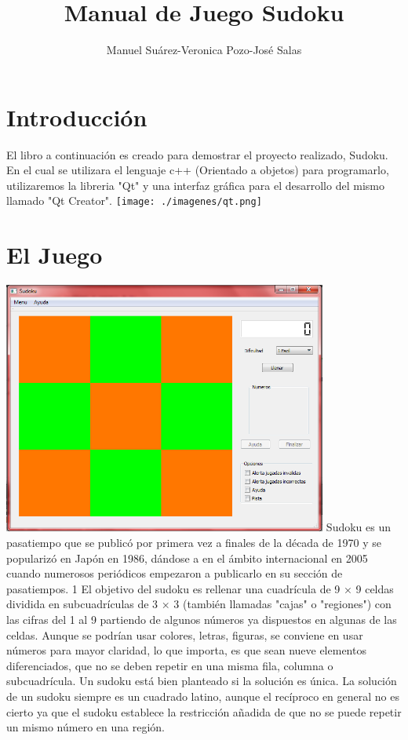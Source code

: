 \documentclass[12pt,oneside]{book}
\title{Manual de Juego Sudoku}
\author{Manuel Suárez-Veronica Pozo-José Salas}
\begin{document}
\maketitle
\tableofcontents

\chapter{Introducción}

El libro a continuación es creado para demostrar el proyecto realizado, Sudoku. 
En el cual se utilizara el lenguaje c++ (Orientado a objetos) para programarlo, utilizaremos la libreria "Qt" y una interfaz gráfica para el desarrollo del mismo llamado
"Qt Creator". 
	\texttt{[image: ./imagenes/qt.png]}

\chapter{El Juego}
	\includegraphics[width=0.8\textwidth]{./imagenes/PantallaPrincipal.png}
	Sudoku es un pasatiempo que se publicó por primera vez a finales de la década de 1970 y se popularizó en Japón en 1986, dándose a 
	en el ámbito internacional en 2005 cuando numerosos periódicos empezaron a publicarlo en su sección de pasatiempos. 1 El objetivo del sudoku es rellenar una cuadrícula de 9 × 9 celdas 
	dividida en subcuadrículas de 3 × 3 (también llamadas "cajas" o "regiones") con las cifras del 1 al 9 partiendo de algunos números ya dispuestos en algunas de las celdas. 
	Aunque se podrían usar colores, letras, figuras, se conviene en usar números para mayor claridad, lo que importa, es que sean nueve elementos diferenciados, que no se deben repetir en una misma fila,
	columna o subcuadrícula. Un sudoku está bien planteado si la solución es única. La solución de un sudoku siempre es un cuadrado latino, aunque el recíproco
	en general no es cierto ya que el sudoku establece la restricción añadida de que no se puede repetir un mismo número en una región.
\end{document}
